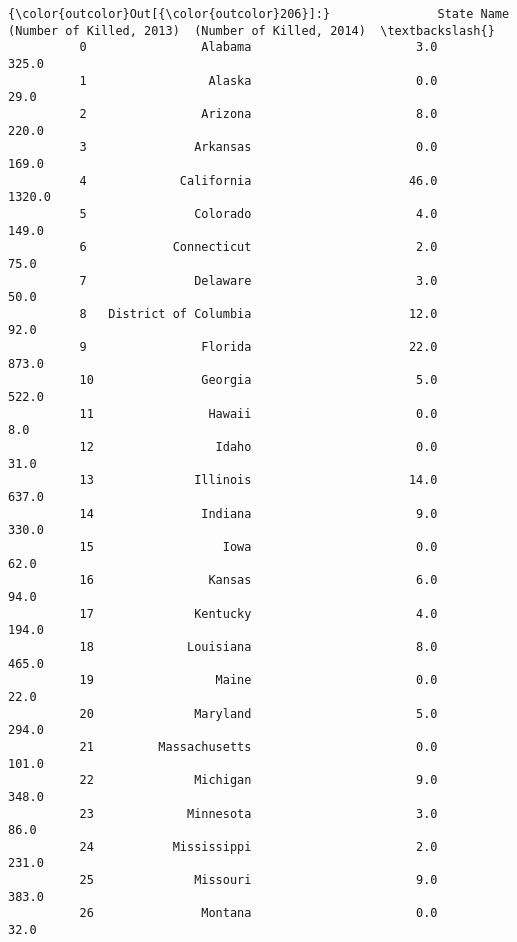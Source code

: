 \documentclass[11pt]{article}
\begin{document}
\begin{Verbatim}[commandchars=\\\{\}]
{\color{outcolor}Out[{\color{outcolor}206}]:}               State Name  (Number of Killed, 2013)  (Number of Killed, 2014)  \textbackslash{}
          0                Alabama                       3.0                     325.0   
          1                 Alaska                       0.0                      29.0   
          2                Arizona                       8.0                     220.0   
          3               Arkansas                       0.0                     169.0   
          4             California                      46.0                    1320.0   
          5               Colorado                       4.0                     149.0   
          6            Connecticut                       2.0                      75.0   
          7               Delaware                       3.0                      50.0   
          8   District of Columbia                      12.0                      92.0   
          9                Florida                      22.0                     873.0   
          10               Georgia                       5.0                     522.0   
          11                Hawaii                       0.0                       8.0   
          12                 Idaho                       0.0                      31.0   
          13              Illinois                      14.0                     637.0   
          14               Indiana                       9.0                     330.0   
          15                  Iowa                       0.0                      62.0   
          16                Kansas                       6.0                      94.0   
          17              Kentucky                       4.0                     194.0   
          18             Louisiana                       8.0                     465.0   
          19                 Maine                       0.0                      22.0   
          20              Maryland                       5.0                     294.0   
          21         Massachusetts                       0.0                     101.0   
          22              Michigan                       9.0                     348.0   
          23             Minnesota                       3.0                      86.0   
          24           Mississippi                       2.0                     231.0   
          25              Missouri                       9.0                     383.0   
          26               Montana                       0.0                      32.0   

\end{Verbatim}
\end{document}
